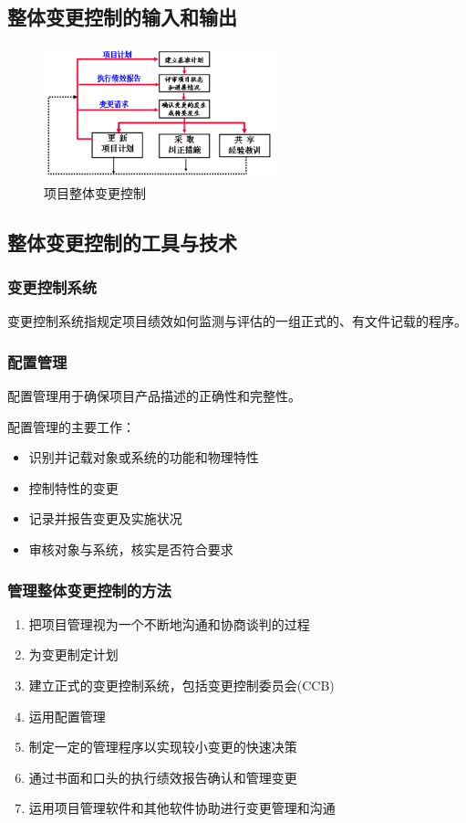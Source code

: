 \subsection{整体变更控制的输入和输出}
\begin{figure}[!h]
	\centering
	\includegraphics[width=0.6\textwidth]{image/3-3}
	\caption{项目整体变更控制}
\end{figure}
\subsection{整体变更控制的工具与技术}
\subsubsection*{变更控制系统}
变更控制系统指规定项目绩效如何监测与评估的一组正式的、有文件记载的程序。
\subsubsection*{配置管理}
配置管理用于确保项目产品描述的正确性和完整性。
\par 配置管理的主要工作：
\begin{itemize}
	\item 识别并记载对象或系统的功能和物理特性
	\item 控制特性的变更
	\item 记录并报告变更及实施状况
	\item 审核对象与系统，核实是否符合要求
\end{itemize}
\subsubsection*{管理整体变更控制的方法}
\begin{enumerate}
	\item 把项目管理视为一个不断地沟通和协商谈判的过程  
	\item 为变更制定计划    
	\item 建立正式的变更控制系统，包括变更控制委员会(CCB)    
	\item 运用配置管理    
	\item 制定一定的管理程序以实现较小变更的快速决策    
	\item 通过书面和口头的执行绩效报告确认和管理变更    
	\item 运用项目管理软件和其他软件协助进行变更管理和沟通
\end{enumerate}